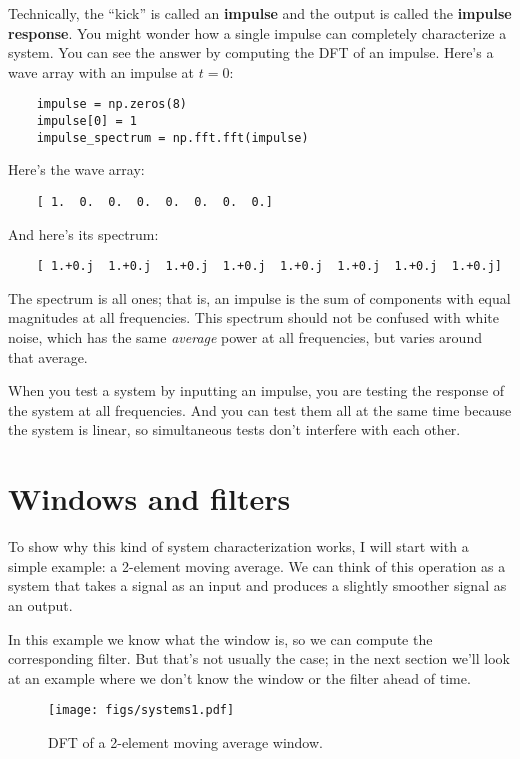 Technically, the ``kick'' is called an {\bf impulse} and the
output is called the {\bf impulse response}.  You might wonder
how a single impulse can completely characterize a system.  You
can see the answer by computing the DFT of an impulse.  Here's
a wave array with an impulse at $t=0$:

\begin{verbatim}
	impulse = np.zeros(8)
	impulse[0] = 1
	impulse_spectrum = np.fft.fft(impulse)
\end{verbatim}

Here's the wave array:

\begin{verbatim}
	[ 1.  0.  0.  0.  0.  0.  0.  0.]
\end{verbatim}

And here's its spectrum:

\begin{verbatim}
	[ 1.+0.j  1.+0.j  1.+0.j  1.+0.j  1.+0.j  1.+0.j  1.+0.j  1.+0.j]
\end{verbatim}

The spectrum is all ones; that is, an impulse is the sum of components
with equal magnitudes at all frequencies.  This
spectrum should not be confused with white noise, which has the same
{\em average} power at all frequencies, but varies around that
average.

When you test a system by inputting
an impulse, you are testing the response of the
system at all frequencies.  And you can test them all at the same
time because the system is linear, so simultaneous tests don't
interfere with each other.


\section{Windows and filters}
\label{winfilt}

To show why this kind of system characterization works, I
will start with a simple example: a 2-element moving average.
We can think of this operation as a system that takes a signal
as an input and produces a slightly smoother signal as an output.

In this example we know what the window is, so we can compute
the corresponding filter.  But that's not usually the case; in the
next section we'll look at an example where we don't know the
window or the filter ahead of time.

\begin{figure}
	\centerline{\texttt{[image: figs/systems1.pdf]}}
	\caption{DFT of a 2-element moving average window.}
	\label{fig.systems1}
\end{figure}

